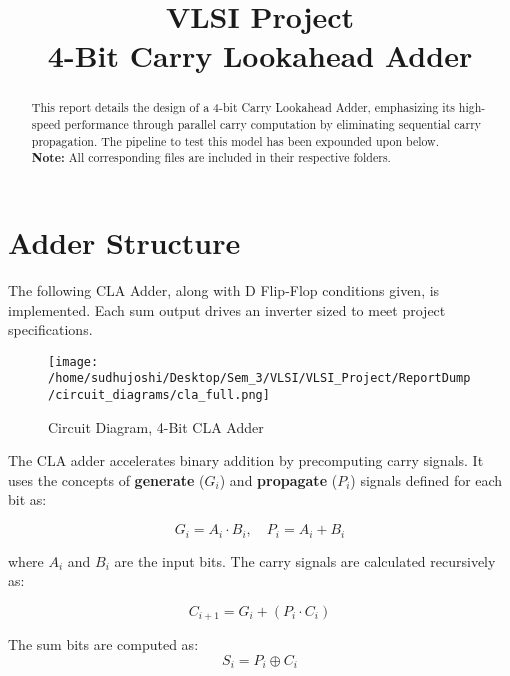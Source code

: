 \documentclass[conference]{IEEEtran}
\begin{document}
\title{VLSI Project \\ 4-Bit Carry Lookahead Adder}

\author{
}

\maketitle

\begin{abstract}
    This report details the design of a 4-bit Carry Lookahead Adder, 
    emphasizing its high-speed performance through parallel carry computation
    by eliminating sequential carry propagation. The pipeline to test this 
    model has been expounded upon below. \\
    \textbf{Note:} All corresponding files are included in their respective folders.   
\end{abstract}


\section{Adder Structure}
The following CLA Adder, along with D Flip-Flop conditions given, is implemented. Each sum output drives an inverter sized to meet 
project specifications.
\begin{figure}[H] 
    \centering
    \texttt{[image: /home/sudhujoshi/Desktop/Sem\_3/VLSI/VLSI\_Project/ReportDump/circuit\_diagrams/cla\_full.png]}
    \caption{Circuit Diagram, 4-Bit CLA Adder} 
\end{figure}
The CLA adder accelerates binary addition by precomputing carry signals. It uses the concepts of \textbf{generate} ($G_i$) and \textbf{propagate} ($P_i$) signals defined for each bit as:

\[
G_i = A_i \cdot B_i, \quad P_i = A_i + B_i
\]

where $A_i$ and $B_i$ are the input bits. The carry signals are calculated recursively as:

\[
C_{i+1} = G_i + (P_i \cdot C_i)
\]

The sum bits are computed as:
\[
S_i = P_i \oplus C_i
\]
\end{document}
